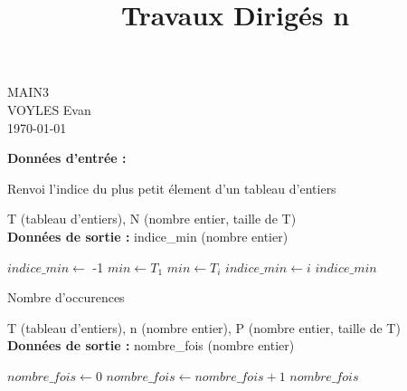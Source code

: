 \documentclass[a4paper]{article}
\title{\Large \raggedright \bf Travaux Dirig\'es n\degree2}
\date{}
\theoremstyle{definition}
\begin{document}
\pagestyle{fancy}


    \makeatletter
    \maketitle
    \vspace{-.65in}
    \noindent
    MAIN3\\
    VOYLES Evan\\
    \today
    \makeatother

    \newenvironment{norm}{

        \normalfont


        }

        \newcommand{\Entree}{\textbf{Donn\'ees d'entr\'ee :  }}
        \newcommand{\Sortie}{\\\textbf{Donn\'ees de sortie :  }}

\begin{algorithm}[h!]
    \caption{Renvoi l'indice du plus petit \'element d'un tableau d'entiers}\label{alg:cap}
    \Entree T (tableau d'entiers), N (nombre entier, taille de T)
    \Sortie indice\_min (nombre entier)
    \begin{algorithmic}[1]
    \State $indice\_min \gets$ -1
    \State $min \gets T_1$
    \State $min \gets T_i$
    \State $indice\_min \gets i$
    \EndIf
    \EndFor
    \State \Return $indice\_min$
    \end{algorithmic}
\end{algorithm}

\begin{algorithm}[h!]
    \caption{Nombre d'occurences}\label{alg:cap}
    \Entree T (tableau d'entiers), n (nombre entier), P (nombre entier, taille de T)
    \Sortie nombre\_fois (nombre entier)
    \begin{algorithmic}[1]
    \State $nombre\_fois \gets 0$
    \State $nombre\_fois \gets nombre\_fois + 1$
    \EndIf
    \EndFor
    \State \Return $nombre\_fois$
    \end{algorithmic}
\end{algorithm}
\end{document}
